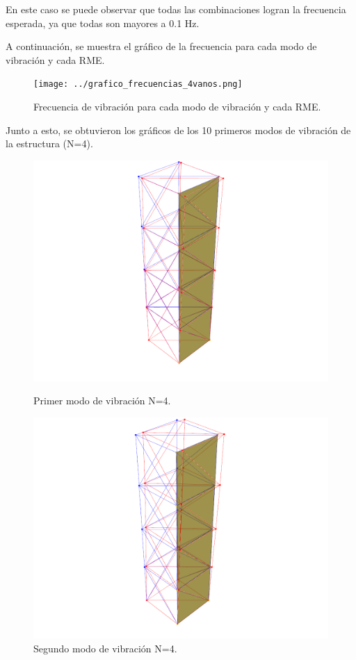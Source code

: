 En este caso se puede observar que todas las combinaciones logran la frecuencia esperada, ya que todas son mayores a 0.1 Hz.

A continuación, se muestra el gráfico de la frecuencia para cada modo de vibración y cada RME. 

\begin{figure}[H]
    \centering
    \texttt{[image: ../grafico\_frecuencias\_4vanos.png]}
    \caption{Frecuencia de vibración para cada modo de vibración y cada RME.}
\end{figure}

Junto a esto, se obtuvieron los gráficos de los 10 primeros modos de vibración de la estructura (N=4).

\begin{figure}[H]
    \begin{minipage}[b]{0.5\textwidth}
        \centering
        \includegraphics[width=\textwidth]{FOTOS/mod1_4.png}
        \caption{Primer modo de vibración N=4.}
    \end{minipage}
    \hfill
    \begin{minipage}[b]{0.5\textwidth}
        \centering
        \includegraphics[width=\textwidth]{FOTOS/mod2_4.png}
        \caption{Segundo modo de vibración N=4.}
    \end{minipage}
\end{figure}

